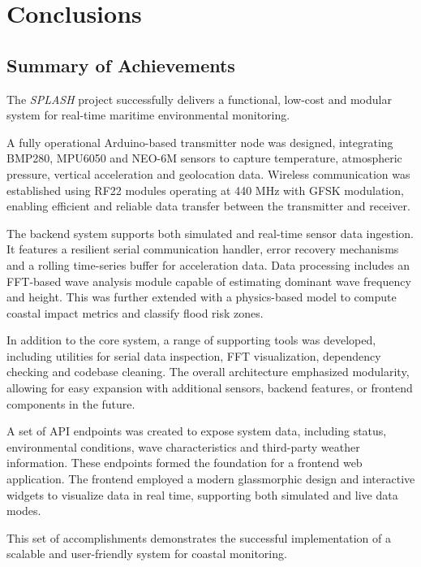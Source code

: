 \documentclass{article}
\begin{document}
\newpage
\section{Conclusions}
    \subsection{Summary of Achievements}
    The \textit{SPLASH} project successfully delivers a functional, low-cost and modular system for real-time maritime environmental monitoring. 
    
    A fully operational Arduino-based transmitter node was designed, integrating BMP280, MPU6050 and NEO-6M sensors to capture temperature, atmospheric pressure, vertical acceleration and geolocation data. Wireless communication was established using RF22 modules operating at 440 MHz with GFSK modulation, enabling efficient and reliable data transfer between the transmitter and receiver.
    
    The backend system supports both simulated and real-time sensor data ingestion. It features a resilient serial communication handler, error recovery mechanisms and a rolling time-series buffer for acceleration data. Data processing includes an FFT-based wave analysis module capable of estimating dominant wave frequency and height. This was further extended with a physics-based model to compute coastal impact metrics and classify flood risk zones.
    
    In addition to the core system, a range of supporting tools was developed, including utilities for serial data inspection, FFT visualization, dependency checking and codebase cleaning. The overall architecture emphasized modularity, allowing for easy expansion with additional sensors, backend features, or frontend components in the future.
    
    A set of API endpoints was created to expose system data, including status, environmental conditions, wave characteristics and third-party weather information. These endpoints formed the foundation for a frontend web application. The frontend employed a modern glassmorphic design and interactive widgets to visualize data in real time, supporting both simulated and live data modes.
    
    This set of accomplishments demonstrates the successful implementation of a scalable and user-friendly system for coastal monitoring.
    
\end{document}
